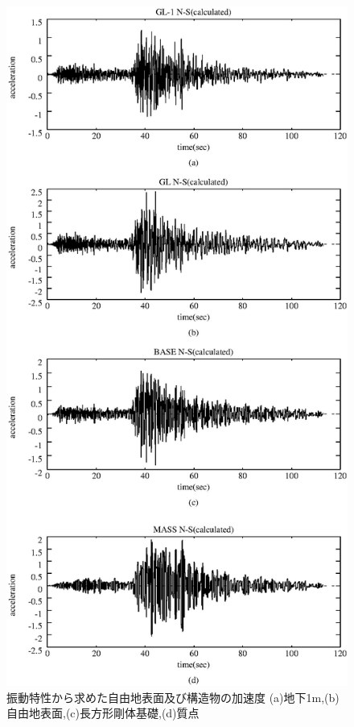 \documentclass[titlepage]{jsarticle}
\begin{document}
\begin{figure}[htbp]
\begin{center}
\includegraphics[scale=0.6]{calc.eps}
\caption[解析波形]{振動特性から求めた自由地表面及び構造物の加速度
(a)地下1m,(b)自由地表面,(c)長方形剛体基礎,(d)質点}
\label{transkasokudo}
\end{center}
\end{figure}
\end{document}
